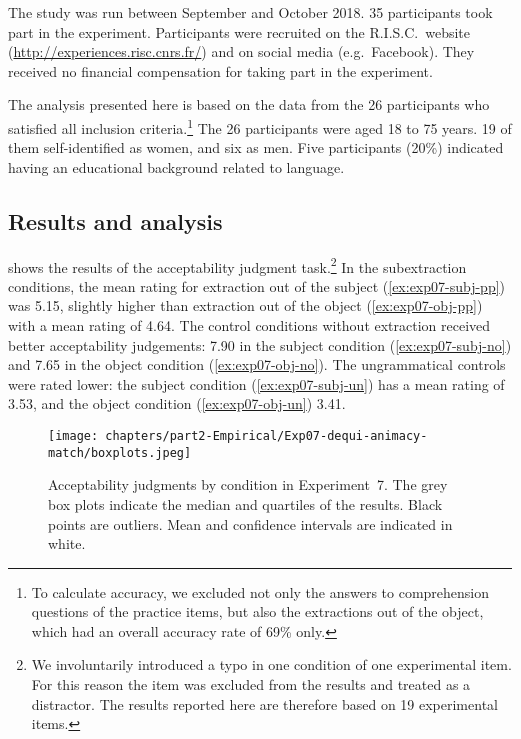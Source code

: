 The study was run between September and October 2018.  
35 participants took part in the experiment. Participants were recruited on the R.I.S.C.\ website (\url{http://experiences.risc.cnrs.fr/}) and on social media (e.g.\ Facebook). They received no financial compensation for taking part in the experiment. 

The analysis presented here is based on the data from the 26 participants who satisfied all inclusion criteria.\footnote{To calculate accuracy, we excluded not only the answers to comprehension questions of the practice items, but also the extractions out of the object, which had an overall accuracy rate of 69\% only.}
The 26 participants were aged 18 to 75 years. 19 of them self-identified as women, and six as men. Five participants (20\%) indicated having an educational background related to language.

\subsection{Results and analysis}

 shows the results of the acceptability judgment task.\footnote{We involuntarily introduced a typo in one condition of one experimental item. For this reason the item was excluded from the results and treated as a distractor. The results reported here are therefore based on 19 experimental items.}
In the subextraction conditions, the mean rating for extraction out of the subject (\ref{ex:exp07-subj-pp}) was 5.15, slightly higher than extraction out of the object (\ref{ex:exp07-obj-pp}) with a mean rating of 4.64. The control conditions without extraction received better acceptability judgements: 7.90 in the subject condition (\ref{ex:exp07-subj-no}) and 7.65 in the object condition (\ref{ex:exp07-obj-no}). The ungrammatical controls were rated lower: the subject condition (\ref{ex:exp07-subj-un}) has a mean rating of 3.53, and the object condition (\ref{ex:exp07-obj-un}) 3.41. 

\begin{figure}
    \centering
    \texttt{[image: chapters/part2-Empirical/Exp07-dequi-animacy-match/boxplots.jpeg]}
    \caption{Acceptability judgments by condition in Experiment~7. The grey box plots indicate the median and quartiles of the results. Black points are outliers. Mean and confidence intervals are indicated in white.}
    \label{fig:exp07-boxplot}
\end{figure}

